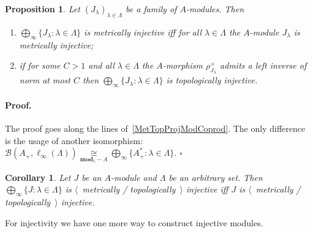 \documentclass[12pt]{article}
\newcommand{\isom}[1]{\mathop{\mathbin{\cong}}\limits_{#1}}
\newtheorem{proposition}[theorem]{Proposition}
\newtheorem{corollary}[theorem]{Corollary}
\renewenvironment{proof}{\paragraph{Proof.}}{\hfill$\square$\medskip}
\begin{document}
\begin{proposition}\label{MetTopInjModProd} Let
    ${(J_\lambda)}_{\lambda\in\Lambda}$ be a family of $A$-modules. Then
    \begin{enumerate}[label = (\roman*)]
        \item $\bigoplus_\infty \{J_\lambda:\lambda\in\Lambda \}$ is metrically
              injective iff for all $\lambda\in\Lambda$ the $A$-module
              $J_\lambda$ is metrically injective;

        \item if for some $C>1$ and all $\lambda\in\Lambda$ the $A$-morphism
              $\rho_{J_\lambda}^+$ admits a left inverse of norm at most $C$
              then $\bigoplus_\infty \{J_\lambda:\lambda\in\Lambda \}$ is
              topologically injective.
    \end{enumerate}
\end{proposition}
\begin{proof} The proof goes along the lines of~\ref{MetTopProjModCoprod}. The
    only difference is the usage of another isomorphism:
    $\mathcal{B}(A_+,\ell_\infty(\Lambda)) 
        \isom{\mathbf{mod}_1-A}\bigoplus_\infty \{A_+^*:\lambda\in\Lambda \}$.
\end{proof}

\begin{corollary}\label{MetTopInjlInftySum} Let $J$ be an $A$-module and
    $\Lambda$ be an arbitrary set. Then
    $\bigoplus_\infty \{J:\lambda\in\Lambda \}$ is
    $\langle$~metrically / topologically~$\rangle$ injective iff $J$ is
    $\langle$~metrically / topologically~$\rangle$ injective.
\end{corollary}

For injectivity we have one more way to construct injective modules.
\end{document}

